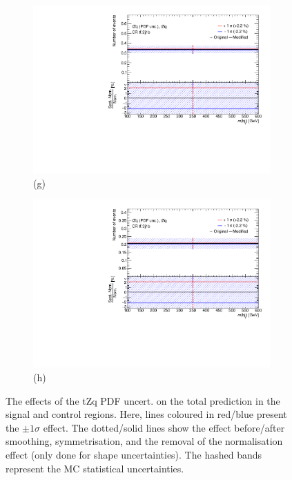 \begin{figure}[!h]
\begin{subfigure}[b]{0.33\linewidth}
  \includegraphics[width=\textwidth]{ubonn-thesis/Chapters/Chapters_07/Figure/Data/Systematic/tZq_pdf/CR_2j1b_tZq_tZq_XS_PDFunc.pdf} 
    \caption*{(g)}
  \end{subfigure} 
  \centering
  \begin{subfigure}[b]{0.33\linewidth}
    \includegraphics[width=\textwidth]{ubonn-thesis/Chapters/Chapters_07/Figure/Data/Systematic/tZq_pdf/CR_3j1b_tZq_tZq_XS_PDFunc.pdf} 
    \caption*{(h)}
  \end{subfigure}
  \caption{The effects of the tZq PDF uncert. on the total prediction in the signal and control regions. Here, lines coloured in red/blue present the $\pm 1 \sigma$ effect. The dotted/solid lines show the effect before/after smoothing, symmetrisation, and the removal of the normalisation effect (only done for shape uncertainties). The hashed bands represent the MC statistical uncertainties.}
  \label{fig:systpdf}
  \end{figure}


